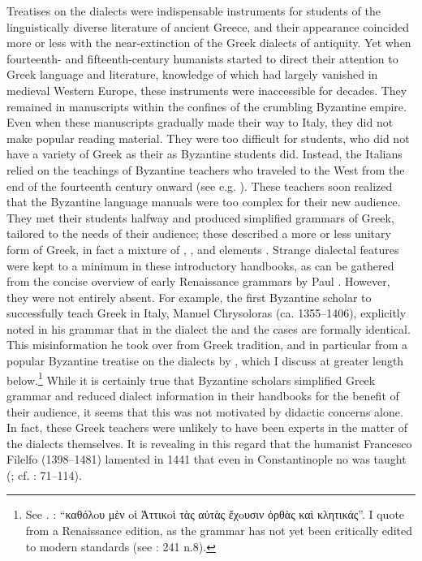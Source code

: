 Treatises on the dialects were indispensable instruments for students of the linguistically diverse literature of ancient Greece, and their appearance coincided more or less with the near-extinction of the Greek dialects of antiquity. Yet when fourteenth- and fifteenth-century  humanists started to direct their attention to Greek language and literature, knowledge of which had largely vanished in medieval Western Europe, these instruments were inaccessible for decades. They remained in manuscripts within the confines of the crumbling Byzantine empire. Even when these manuscripts gradually made their way to Italy, they did not make popular reading material. They were too difficult for  students, who did not have a variety of Greek as their  as Byzantine students did. Instead, the Italians relied on the teachings of Byzantine teachers who traveled to the West from the end of the fourteenth century onward (see e.g. \citealt{Harris1995,Botley2010,Wilson2016}). These teachers soon realized that the Byzantine language manuals were too complex for their new audience. They met their students halfway and produced simplified grammars of Greek, tailored to the needs of their  audience; these described a more or less unitary form of Greek, in fact a mixture of , , and  elements \citep[123]{Ciccolella2008}. Strange dialectal features were kept to a minimum in these introductory handbooks, as can be gathered from the concise overview of early Renaissance grammars by Paul \citet{Botley2010}. However, they were not entirely absent. For example, the first Byzantine scholar to successfully teach Greek in Italy, Manuel Chrysoloras (ca. 1355–1406), explicitly noted in his grammar that in the  dialect the  and the  cases are formally identical. This misinformation he took over from Greek tradition, and in particular from a popular Byzantine treatise on the dialects by , which I discuss at greater length below.\footnote{See \textcite[166 n.70]{Botley2010}. \citet[20]{Chrysoloras1512}: “καθόλoυ μὲν oἱ Ἀττικoὶ τὰς αὐτὰς ἔχoυσιν ὀρθὰς καὶ κλητικάς”. I quote from a Renaissance edition, as the grammar has not yet been critically edited to modern standards (see \citealt{Nuti2013}: 241 n.8).} While it is certainly true that Byzantine scholars simplified Greek grammar and reduced dialect information in their handbooks for the benefit of their  audience, it seems that this was not motivated by didactic concerns alone. In fact, these Greek teachers were unlikely to have been experts in the matter of the dialects themselves. It is revealing in this regard that the  humanist Francesco Filelfo (1398–1481) lamented in 1441 that even in Constantinople no  was taught (\citealt[88 n.4]{Rotolo1973}; cf. \citealt{Botley2010}: 71–114).

